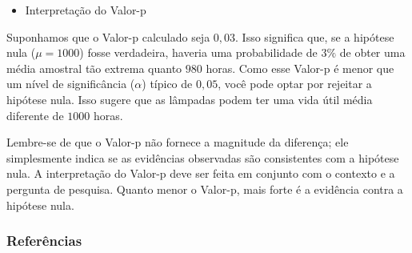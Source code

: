 \documentclass[12pt]{beamer}
\begin{document}
\begin{frame}{}
\begin{block}{}
\justifying
\begin{itemize}
    \item Interpretação do Valor-p
\end{itemize}

Suponhamos que o Valor-p calculado seja $0,03$. Isso significa que, se a hipótese nula ($\mu = 1000$) fosse verdadeira, haveria uma probabilidade de $3\%$ de obter uma média amostral tão extrema quanto $980$ horas. Como esse Valor-p é menor que um nível de significância ($\alpha$) típico de $0,05$, você pode optar por rejeitar a hipótese nula. Isso sugere que as lâmpadas podem ter uma vida útil média diferente de $1000$ horas.
\end{block}
\pause
\begin{block}{}
\justifying
Lembre-se de que o Valor-p não fornece a magnitude da diferença; ele simplesmente indica se as evidências observadas são consistentes com a hipótese nula. A interpretação do Valor-p deve ser feita em conjunto com o contexto e a pergunta de pesquisa. Quanto menor o Valor-p, mais forte é a evidência contra a hipótese nula.
\end{block}
\end{frame}

\begin{frame}[allowframebreaks]
\frametitle{\bf Referências}
\printbibliography
\end{frame}
\end{document}
